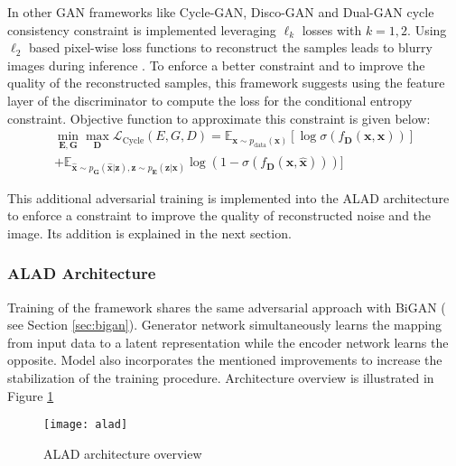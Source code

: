 {In other GAN frameworks like Cycle-GAN\cite{Zhu2017UnpairedIT}, Disco-GAN \cite{Kim2017LearningTD}
and Dual-GAN \cite{Yi2017DualGANUD} cycle consistency constraint is implemented leveraging
$\ell_{k}$ losses with $k=1,2$. Using $\ell_2$ based pixel-wise loss functions to reconstruct the samples
leads to blurry images during inference \cite{Larsen2016AutoencodingBP}\cite{Li2017TowardsUA}.
To enforce a better constraint and to improve the quality of the reconstructed samples, this
framework suggests using the feature layer of the discriminator to compute the loss for the
conditional entropy constraint. Objective function to approximate this constraint is given
below:
\begin{multline}
    \label{eqn:alice}
     \min _{\boldsymbol{E}, \boldsymbol{G}} \max _{\boldsymbol{D}}
\mathcal{L}_{\mathrm{Cycle}}(E,G,D)
=\mathbb{E}_{\boldsymbol{x} \sim p_{\text{data}}(\boldsymbol{x})}\left[\log
\sigma\left(f_{\boldsymbol{D}}(\boldsymbol{x}, \boldsymbol{x})\right)\right] \\
+\mathbb{E}_{\hat{\boldsymbol{x}} \sim p_{\boldsymbol{G}}(\hat{\boldsymbol{x}} | \boldsymbol{z}),
\boldsymbol{z} \sim p_{\boldsymbol{E}}(\boldsymbol{z} | \boldsymbol{x})} \log
\left(1-\sigma\left(f_{\boldsymbol{D}}(\boldsymbol{x}, \hat{\boldsymbol{x}})\right)\right) ] 
\end{multline}

This additional adversarial training is implemented into the ALAD architecture to enforce a
constraint to improve the quality of reconstructed noise and the image. Its addition is explained in
the next section.

\subsubsection{ALAD Architecture}
\label{sec:alad_arc}

Training of the framework shares the same adversarial approach with BiGAN
( see Section \ref{sec:bigan}). Generator network simultaneously learns the mapping from input data to a latent
representation while the encoder network learns the opposite. Model also incorporates the mentioned
improvements to increase the stabilization of the training procedure. Architecture overview is
illustrated in Figure \ref{fig:alad_model}

\begin{figure}[h!]
	\centering
	\texttt{[image: alad]}
    \caption{ALAD architecture overview}
    \label{fig:alad_model}
\end{figure}

}
